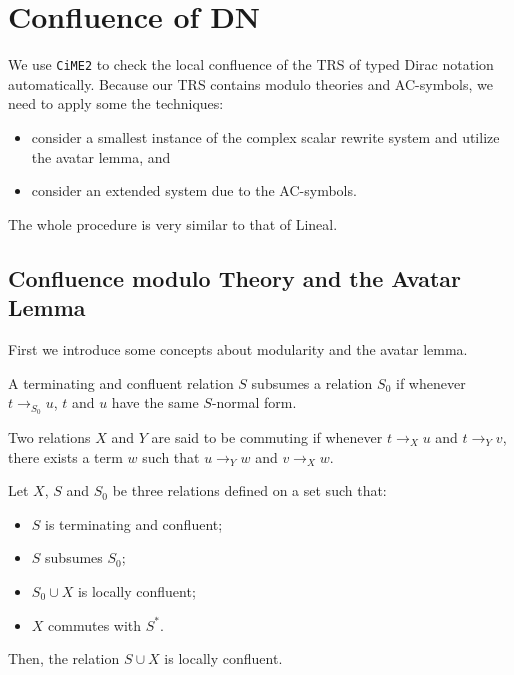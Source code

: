 \section{Confluence of DN}

We use \texttt{CiME2} to check the local confluence of the TRS of typed Dirac notation automatically. Because our TRS contains modulo theories and AC-symbols, we need to apply some the techniques:

\begin{itemize}
  \item consider a smallest instance of the complex scalar rewrite system and utilize the avatar lemma, and
  \item consider an extended system due to the AC-symbols.
\end{itemize}

The whole procedure is very similar to that of Lineal.

\subsection{Confluence modulo Theory and the Avatar Lemma}

First we introduce some concepts about modularity and the avatar lemma.

\begin{definition}[Subsumption]
  A terminating and confluent relation $S$ subsumes a relation $S_0$ if whenever $t \to_{S_0} u$, $t$ and $u$ have the same $S$-normal form.
\end{definition}

\begin{definition}
  Two relations $X$ and $Y$ are said to be commuting if whenever $t \to_X u$ and $t \to_Y v$, there exists a term $w$ such that $u \to_Y w$ and $v \to_X w$.
\end{definition}

\begin{proposition} \cite{Arrighi2005} Let $X$, $S$ and $S_0$ be three relations defined on a set such that:
  \begin{itemize}
    \item $S$ is terminating and confluent;
    \item $S$ subsumes $S_0$;
    \item $S_0 \cup X$ is locally confluent;
    \item $X$ commutes with $S^*$.
  \end{itemize}
  Then, the relation $S \cup X$ is locally confluent.
\end{proposition}

